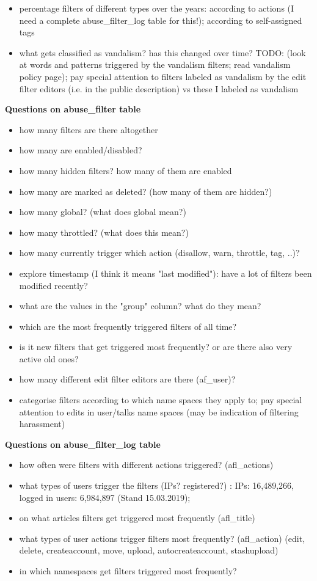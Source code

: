 \begin{itemize}
    \item percentage filters of different types over the years: according to actions (I need a complete abuse\_filter\_log table for this!); according to self-assigned tags %
    \item what gets classified as vandalism? has this changed over time? TODO: (look at words and patterns triggered by the vandalism filters; read vandalism policy page); pay special attention to filters labeled as vandalism by the edit filter editors (i.e. in the public description) vs these I labeled as vandalism
\end{itemize}

\textbf{Questions on abuse\_filter table}
\begin{itemize}
    \item how many filters are there altogether
    \item how many are enabled/disabled?
    \item how many hidden filters? how many of them are enabled
    \item how many are marked as deleted? (how many of them are hidden?)
    \item how many global? (what does global mean?)
    \item how many throttled? (what does this mean?)
    \item how many currently trigger which action (disallow, warn, throttle, tag, ..)?
    \item explore timestamp (I think it means "last modified"): have a lot of filters been modified recently?
    \item what are the values in the "group" column? what do they mean?
    \item which are the most frequently triggered filters of all time?
    \item is it new filters that get triggered most frequently? or are there also very active old ones?
    \item how many different edit filter editors are there (af\_user)?
    \item categorise filters according to which name spaces they apply to; pay special attention to edits in user/talks name spaces (may be indication of filtering harassment)
\end{itemize}

\textbf{Questions on abuse\_filter\_log table}
\begin{itemize}
    \item how often were filters with different actions triggered? (afl\_actions)
    \item what types of users trigger the filters (IPs? registered?) : IPs: 16,489,266, logged in users: 6,984,897 (Stand 15.03.2019);
    \item on what articles filters get triggered most frequently (afl\_title)
    \item what types of user actions trigger filters most frequently? (afl\_action) (edit, delete, createaccount, move, upload, autocreateaccount, stashupload)
    \item in which namespaces get filters triggered most frequently?
\end{itemize}


